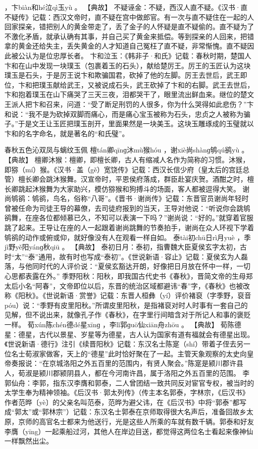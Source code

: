 \documentclass[12pt,UTF8]{ctexbook}
\begin{document}
，卞biàn和hé泣qì玉yù
。
【典故】
不疑诬金：不疑，西汉人直不疑。《汉书·直不疑传》记载：西汉文帝时，直不疑在宫中做郎官。有一次与直不疑住在一起的人回家探亲，错把别人的黄金带走了，丢了金子的人怀疑是直不疑偷的。直不疑为了不激化矛盾，就承认确有其事，并自己买了黄金来抵偿。等到探亲的人回来，把错拿的黄金还给失主，丢失黄金的人才知道自己冤枉了直不疑，非常惭愧。直不疑因此被公认为是位忠厚长者。
卞和泣玉：《韩非子·和氏》记载：春秋时期，楚国人卞和在山中发现一块璞玉（包裹着玉的石头），献给楚厉王。厉王的玉匠认为这块璞玉是石头，于是厉王说卞和欺骗国君，砍掉了他的左脚。厉王去世后，武王即位，卞和把璞玉献给武王，又被说成石头，武王砍掉了卞和的右脚。武王去世后，卞和抱着璞玉在山下痛哭了三天三夜，泪都哭干了，眼里流出鲜血来。继位的楚文王派人把卞和召来，问道：“受了断足刑罚的人很多，你为什么哭得如此悲伤？”卞和说：“我不是为砍掉双脚而痛心，而是痛心宝玉被称为石头，忠贞之人被称为骗子。”于是文王让玉匠把璞玉剖开，里面果然是一块美玉。这块玉雕琢成的玉璧就以卞和的名字命名，就是著名的“和氏璧”。

春秋五色沁双凤与螭纹玉佩
檀tán卿qīnɡ沐mù猴hóu
，谢xiè尚shànɡ鸲qú鹆yù
。
【典故】
檀卿沐猴：檀卿，即檀长卿，古人有缩减人名作为简称的习惯。沐猴，即猕（mí）猴。《汉书·盖（gě）宽饶传》记载：西汉长信少府（皇太后的宫廷总管）檀长卿会跳沐猴舞。汉宣帝时，平恩侯府落成，群臣赴宴庆贺。酒酣之时，檀长卿跳起沐猴舞为大家助兴，模仿猕猴和狗搏斗的场面，客人都被逗得大笑。
谢尚鸲鹆：鸲鹆，鸟名，俗称“八哥”。《晋书·谢尚传》记载：东晋官员谢尚年轻时曾被任命为司徒王导的幕僚，去司徒府报到的当天，王导对他说：“听说你会跳鸲鹆舞，在座各位都倾慕已久，不知可以表演一下吗？”谢尚说：“好的。”就穿着官服跳了起来。王导让在座的人一起跟着谢尚跳舞的节奏拍手，谢尚在众人环视下学着鸲鹆的动作或俯或仰，就好像没有人在观看一样自如。
泰tài初chū日rì月yuè
，季jì野yě阳yánɡ秋qiū
。
【典故】
泰初日月：泰初，指曹魏大臣夏侯玄字太初，古时“太”“泰”通用，故有时也写成“泰初”。《世说新语·容止》记载：夏侯玄为人磊落，与他同时代的人评价说：“夏侯玄豁达开朗，好像把日月放在怀中一样，一切心思都表露在外。”
季野阳秋：阳秋，即我国古代史书《春秋》，晋简文帝的生母郑太后小名“阿春”，文帝即位以后，东晋的统治区域都避讳“春”字，《春秋》也被改称《阳秋》。《世说新语·赏誉》记载：东晋人桓彝（yí）评价褚裒（字季野，裒音póu）说：“季野有皮里阳秋。”所谓皮里阳秋，是指褚裒对时人时事有一套自己的见解，但不说出来，就像孔子作《春秋》，在字里行间暗含对于所记人和事的褒贬一样。
荀xún陈chén德dé星xīnɡ
，李lǐ郭ɡuō仙xiān舟zhōu
。
【典故】
荀陈德星：德星，古代以景星、岁星等为德星，古人认为国家有道有福就会有德星出现。《世说新语·德行》注引《续晋阳秋》记载：东汉名士陈寔（shí）带着子侄去另一位名士荀淑家做客，天上的“德星”此时恰好聚在了一起。主管天象观察的太史向皇帝奏报说：“在京城洛阳之外五百里的范围内，有贤人聚会。”陈寔是颍川郡许县人，荀淑是颍川郡颍阴县人，都在今河南许昌，属于洛阳之外五百里的范围。
李郭仙舟：李郭，指东汉李膺和郭泰，二人曾团结一致共同反对宦官专权，被当时的太学生奉为精神领袖。《后汉书·郭太列传》（传主本名郭泰，字林宗，《后汉书》作者范晔〔yè〕的父亲名叫范泰，范晔为避父讳，在《后汉书》中将“郭泰”都写成“郭太”或“郭林宗”）记载：东汉名士郭泰在京师取得很大名声后，准备回故乡太原，京师的高官名士都来为他送行，光是这些人所乘的车就有数千辆。郭泰和好友李膺（yīng）一起乘船过河，其他人在岸边目送，都觉得这两位名士看起来像神仙一样飘然出尘。
\end{document}
